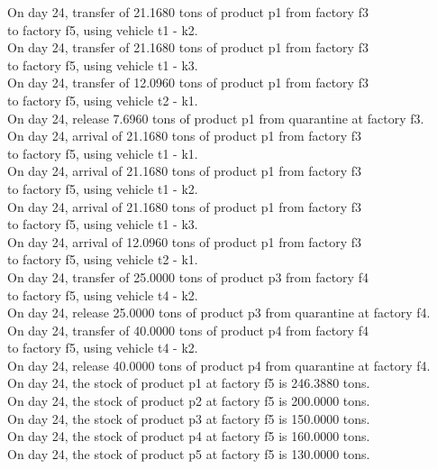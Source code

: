 \begin{table}[H]
\begin{multicols}{2}
\begin{tabbing}
On day 24, transfer of 21.1680 tons of product p1 from factory f3 \\ to factory f5, using vehicle t1 - k2. \\
On day 24, transfer of 21.1680 tons of product p1 from factory f3 \\ to factory f5, using vehicle t1 - k3. \\
On day 24, transfer of 12.0960 tons of product p1 from factory f3 \\ to factory f5, using vehicle t2 - k1. \\
On day 24, release 7.6960 tons of product p1 from quarantine at factory f3. \\
On day 24, arrival of 21.1680 tons of product p1 from factory f3 \\ to factory f5, using vehicle t1 - k1. \\
On day 24, arrival of 21.1680 tons of product p1 from factory f3 \\ to factory f5, using vehicle t1 - k2. \\
On day 24, arrival of 21.1680 tons of product p1 from factory f3 \\ to factory f5, using vehicle t1 - k3. \\
On day 24, arrival of 12.0960 tons of product p1 from factory f3 \\ to factory f5, using vehicle t2 - k1. \\
On day 24, transfer of 25.0000 tons of product p3 from factory f4 \\ to factory f5, using vehicle t4 - k2. \\
On day 24, release 25.0000 tons of product p3 from quarantine at factory f4. \\
On day 24, transfer of 40.0000 tons of product p4 from factory f4 \\ to factory f5, using vehicle t4 - k2. \\
On day 24, release 40.0000 tons of product p4 from quarantine at factory f4. \\
On day 24, the stock of product p1 at factory f5 is 246.3880 tons. \\
On day 24, the stock of product p2 at factory f5 is 200.0000 tons. \\
On day 24, the stock of product p3 at factory f5 is 150.0000 tons. \\
On day 24, the stock of product p4 at factory f5 is 160.0000 tons. \\
On day 24, the stock of product p5 at factory f5 is 130.0000 tons. \\

\end{tabbing}
\end{multicols}
\end{table}

